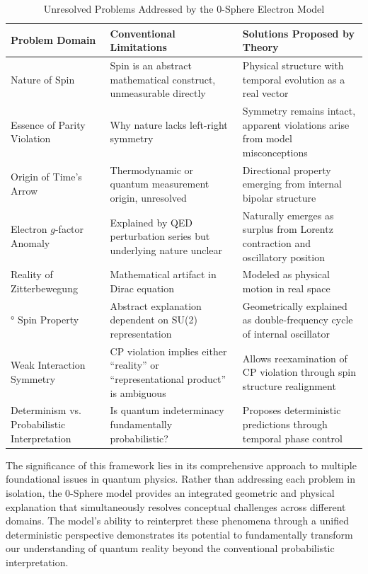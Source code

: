 \documentclass[12pt,letterpaper]{article} %
\begin{document}
\begin{table}[t!]
\centering
\caption{Unresolved Problems Addressed by the 0-Sphere Electron Model}
\label{tab:unresolved_problems}
\renewcommand{\arraystretch}{1.4}
\begin{tabular}{p{5.0cm}p{5.0cm}p{5.0cm}}
\toprule
\textbf{Problem Domain} & \textbf{Conventional Limitations} & \textbf{Solutions Proposed by Theory} \\
\midrule
Nature of Spin & Spin is an abstract mathematical construct, unmeasurable directly & Physical structure with temporal evolution as a real vector \\
\addlinespace[0.3cm]
Essence of Parity Violation & Why nature lacks left-right symmetry & Symmetry remains intact, apparent violations arise from model misconceptions \\
\addlinespace[0.3cm]
Origin of Time's Arrow & Thermodynamic or quantum measurement origin, unresolved & Directional property emerging from internal bipolar structure \\
\addlinespace[0.3cm]
Electron $g$-factor Anomaly & Explained by QED perturbation series but underlying nature unclear & Naturally emerges as surplus from Lorentz contraction and oscillatory position \\
\addlinespace[0.3cm]
Reality of Zitterbewegung & Mathematical artifact in Dirac equation & Modeled as physical motion in real space \\
\addlinespace[0.3cm]
720° Spin Property & Abstract explanation dependent on SU(2) representation & Geometrically explained as double-frequency cycle of internal oscillator \\
\addlinespace[0.3cm]
Weak Interaction Symmetry & CP violation implies either ``reality'' or ``representational product'' is ambiguous & Allows reexamination of CP violation through spin structure realignment \\
\addlinespace[0.3cm]
Determinism vs. Probabilistic Interpretation & Is quantum indeterminacy fundamentally probabilistic? & Proposes deterministic predictions through temporal phase control \\
\bottomrule
\end{tabular}
\end{table}

The significance of this framework lies in its comprehensive approach to multiple foundational issues in quantum physics. Rather than addressing each problem in isolation, the 0-Sphere model provides an integrated geometric and physical explanation that simultaneously resolves conceptual challenges across different domains. The model's ability to reinterpret these phenomena through a unified deterministic perspective demonstrates its potential to fundamentally transform our understanding of quantum reality beyond the conventional probabilistic interpretation.
\end{document}
